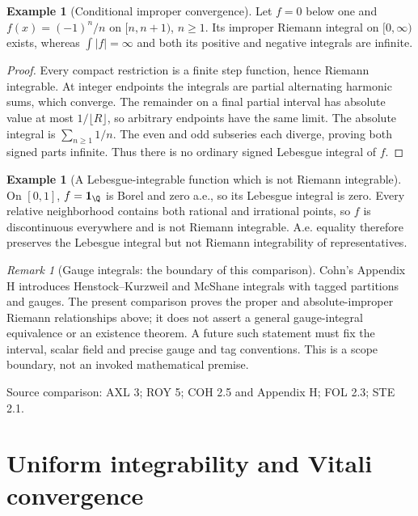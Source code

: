 \documentclass[11pt,oneside,openany]{book}
\theoremstyle{definition}
\newtheorem{example}[theorem]{Example}
\theoremstyle{remark}
\newtheorem{remark}[theorem]{Remark}
\newcommand{\one}{\mathbf1}\newcommand{\ind}[1]{\mathbf1_{#1}}
\newcommand{\family}[1]{}
\newcommand{\source}[1]{\par\begingroup\small\sffamily\color{black!65}Source comparison: #1\par\endgroup}
\begin{document}
\begin{example}[Conditional improper convergence]\family{D11.16.conditional_improper_counterexample}\label{d11:16:conditional-improper-counterexample}
Let $f=0$ below one and $f(x)=(-1)^n/n$ on $[n,n+1)$, $n\geq1$.
Its improper Riemann integral on $[0,\infty)$ exists, whereas
$\int|f|=\infty$ and both its positive and negative integrals are infinite.
\end{example}
\begin{proof}
Every compact restriction is a finite step function, hence Riemann
integrable. At integer endpoints the integrals are partial alternating
harmonic sums, which converge. The remainder on a final partial interval
has absolute value at most $1/\lfloor R\rfloor$, so arbitrary endpoints
have the same limit. The absolute integral is $\sum_{n\geq1}1/n$.
The even and odd subseries each diverge, proving both signed parts
infinite. Thus there is no ordinary signed Lebesgue integral of $f$.
\end{proof}

\begin{example}[A Lebesgue-integrable function which is not Riemann integrable]\family{D11.16.lebesgue_not_riemann}\label{d11:16:lebesgue-not-riemann}
On $[0,1]$, $f=\one_\Q$ is Borel and zero a.e., so its Lebesgue
integral is zero. Every relative neighborhood contains both rational and
irrational points, so $f$ is discontinuous everywhere and is not Riemann
integrable. A.e. equality therefore preserves the Lebesgue integral but
not Riemann integrability of representatives.
\end{example}

\begin{remark}[Gauge integrals: the boundary of this comparison]\family{D11.16.gauge_integral_boundary}\label{d11:16:gauge-integral-boundary}
Cohn's Appendix H introduces Henstock--Kurzweil and McShane integrals
with tagged partitions and gauges. The present comparison proves the
proper and absolute-improper Riemann relationships above; it does not
assert a general gauge-integral equivalence or an existence theorem.
A future such statement must fix the interval, scalar field and precise
gauge and tag conventions. This is a scope boundary, not an invoked
mathematical premise.
\end{remark}
\source{AXL 3; ROY 5; COH 2.5 and Appendix H; FOL 2.3; STE 2.1.}



\chapter{Uniform integrability and Vitali convergence}\label{ch:d11-17}
\end{document}
